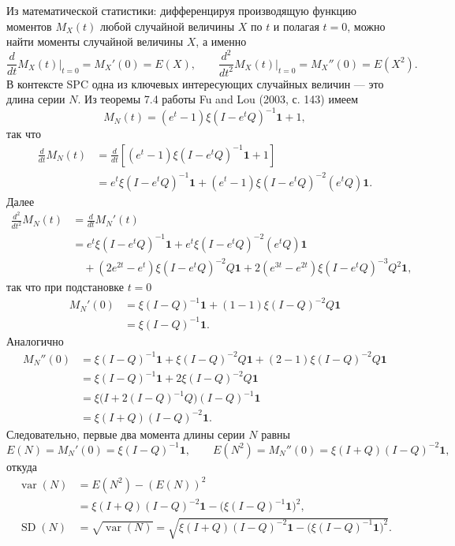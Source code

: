 Из математической статистики: дифференцируя производящую функцию моментов \(M_X(t)\) любой случайной величины \(X\) по \(t\) и полагая \(t = 0\), можно найти моменты случайной величины \(X\), а именно
\[
	\frac{d}{dt} M_X(t)\Big|_{t=0} = M_X'(0) = E(X), \qquad
	\frac{d^2}{dt^2} M_X(t)\Big|_{t=0} = M_X''(0) = E(X^2).
\]
В контексте SPC одна из ключевых интересующих случайных величин — это длина серии \(N\). Из теоремы 7.4 работы Fu and Lou (2003, с. 143) имеем
\[
	M_N(t) = (e^t - 1)\xi (I - e^t Q)^{-1}\mathbf{1} + 1,
\]
так что
\[
\begin{aligned}
	\frac{d}{dt} M_N(t)
	&= \frac{d}{dt}\left[(e^t - 1)\xi (I - e^t Q)^{-1}\mathbf{1} + 1\right] \\
	&= e^t \xi (I - e^t Q)^{-1}\mathbf{1}
	   + (e^t - 1)\xi (I - e^t Q)^{-2}(e^t Q)\mathbf{1}.
\end{aligned}
\]
Далее
\[
\begin{aligned}
	\frac{d^2}{dt^2} M_N(t)
	&= \frac{d}{dt} M_N'(t) \\
	&= e^t \xi (I - e^t Q)^{-1}\mathbf{1}
	   + e^t \xi (I - e^t Q)^{-2}(e^t Q)\mathbf{1} \\
	&\quad + (2e^{2t} - e^t)\xi (I - e^t Q)^{-2}Q\mathbf{1}
	   + 2(e^{3t} - e^{2t})\xi (I - e^t Q)^{-3}Q^2\mathbf{1},
\end{aligned}
\]
так что при подстановке \(t = 0\)
\[
\begin{aligned}
	M_N'(0)
	&= \xi (I - Q)^{-1}\mathbf{1} + (1 - 1)\xi (I - Q)^{-2}Q\mathbf{1} \\
	&= \xi (I - Q)^{-1}\mathbf{1}.
\end{aligned}
\]
Аналогично
\[
\begin{aligned}
	M_N''(0)
	&= \xi (I - Q)^{-1}\mathbf{1} + \xi (I - Q)^{-2}Q\mathbf{1}
	   + (2 - 1)\xi (I - Q)^{-2}Q\mathbf{1} \\
	&= \xi (I - Q)^{-1}\mathbf{1} + 2\xi (I - Q)^{-2}Q\mathbf{1} \\
	&= \xi\big(I + 2(I - Q)^{-1}Q\big)(I - Q)^{-1}\mathbf{1} \\
	&= \xi (I + Q)(I - Q)^{-2}\mathbf{1}.
\end{aligned}
\]
Следовательно, первые два момента длины серии \(N\) равны
\[
	E(N) = M_N'(0) = \xi (I - Q)^{-1}\mathbf{1}, \qquad
	E(N^2) = M_N''(0) = \xi (I + Q)(I - Q)^{-2}\mathbf{1},
\]
откуда
\[
\begin{aligned}
	\operatorname{var}(N)
	&= E(N^2) - (E(N))^2 \\
	&= \xi (I + Q)(I - Q)^{-2}\mathbf{1} - \big(\xi (I - Q)^{-1}\mathbf{1}\big)^2, \\
	\operatorname{SD}(N)
	&= \sqrt{\operatorname{var}(N)}
	 = \sqrt{\xi (I + Q)(I - Q)^{-2}\mathbf{1} - \big(\xi (I - Q)^{-1}\mathbf{1}\big)^2}.
\end{aligned}
\]

